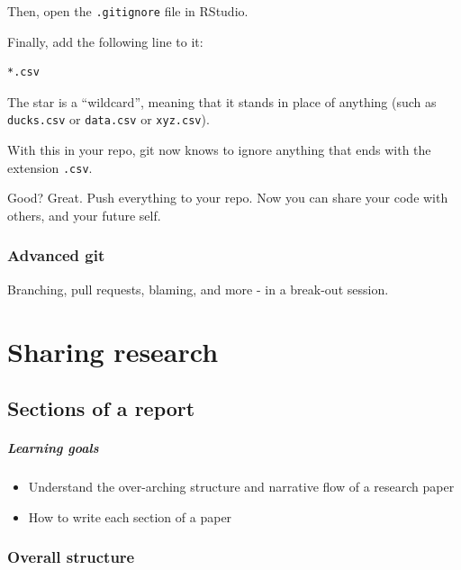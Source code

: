 \documentclass[
]{book}
\providecommand{\tightlist}{%
  \setlength{\itemsep}{0pt}\setlength{\parskip}{0pt}}
\begin{document}
Then, open the \texttt{.gitignore} file in RStudio.

Finally, add the following line to it:

\begin{verbatim}
*.csv
\end{verbatim}

The star is a ``wildcard'', meaning that it stands in place of anything (such as \texttt{ducks.csv} or \texttt{data.csv} or \texttt{xyz.csv}).

With this in your repo, git now knows to ignore anything that ends with the extension \texttt{.csv}.

Good? Great. Push everything to your repo. Now you can share your code with others, and your future self.

\hypertarget{advanced-git}{%
\section*{Advanced git}\label{advanced-git}}

Branching, pull requests, blaming, and more - in a break-out session.

\hypertarget{part-sharing-research}{%
\part{Sharing research}\label{part-sharing-research}}

\hypertarget{sections-of-a-report}{%
\chapter{Sections of a report}\label{sections-of-a-report}}

\hypertarget{learning-goals-22}{%
\subsubsection*{Learning goals}\label{learning-goals-22}}

\begin{itemize}
\tightlist
\item
  Understand the over-arching structure and narrative flow of a research paper\\
\item
  How to write each section of a paper
\end{itemize}

\hypertarget{overall-structure}{%
\section*{Overall structure}\label{overall-structure}}
\end{document}
